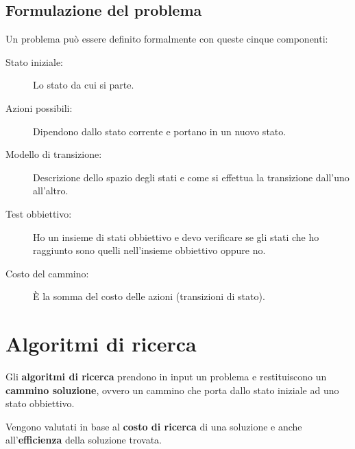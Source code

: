 \subsection{Formulazione del problema}
Un problema pu\`o essere definito formalmente con queste cinque componenti:
\begin{description}
	\item[Stato iniziale:] Lo stato da cui si parte.
	\item[Azioni possibili:] Dipendono dallo stato corrente e portano in un nuovo stato.
	\item[Modello di transizione:] Descrizione dello spazio degli stati e come si effettua
	      la transizione dall'uno all'altro.
	\item[Test obbiettivo:] Ho un insieme di stati obbiettivo e devo verificare se gli stati
	      che ho raggiunto sono quelli nell'insieme obbiettivo oppure no.
	\item[Costo del cammino:] \`E la somma del costo delle azioni (transizioni di stato).
\end{description}

\section{Algoritmi di ricerca}
Gli \textbf{algoritmi di ricerca} prendono in input un problema e restituiscono un
\textbf{cammino soluzione}, ovvero un cammino che porta dallo stato iniziale ad uno stato
obbiettivo.

Vengono valutati in base al \textbf{costo di ricerca} di una soluzione e anche
all'\textbf{efficienza} della soluzione trovata.
